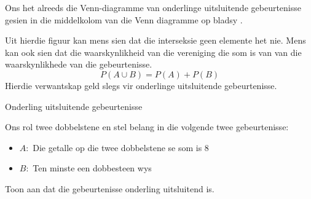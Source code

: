 Ons het alreeds die Venn-diagramme van onderlinge uitsluitende gebeurtenisse gesien in die middelkolom van die Venn diagramme op bladsy \pageref{fig:venn_union_intersection}.

\begin{figure}[H]
  
\end{figure}

Uit hierdie figuur kan mens sien dat die interseksie geen elemente het nie. Mens kan ook sien dat die waarskynlikheid van die vereniging die som is van van die waarskynlikhede van die gebeurtenisse.
\[P(A \cup B) = P(A) + P(B)\]
Hierdie verwantskap geld slegs vir onderlinge uitsluitende gebeurtenisse.

\begin{wex}{Onderling uitsluitende gebeurtenisse}{
\begin{minipage}{\textwidth}
  Ons rol twee dobbelstene en stel belang in die volgende twee gebeurtenisse:
  \begin{itemize}
  \item[] $A:$ Die getalle op die twee dobbelstene se som is $8$
  \item[] $B:$ Ten minste een dobbesteen wys 
  \end{itemize}
  Toon aan dat die gebeurtenisse onderling uitsluitend is.
\end{minipage}
}{

}
\end{wex}

